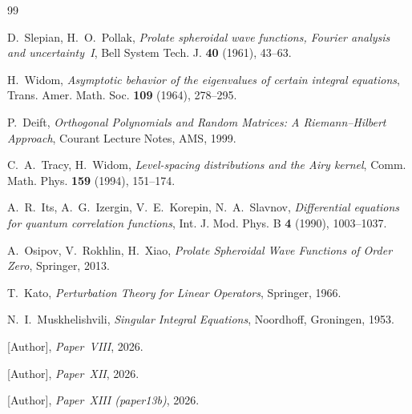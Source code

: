 \documentclass[12pt,a4paper]{amsart}
\theoremstyle{definition}
\theoremstyle{remark}
\begin{document}
\begin{thebibliography}{99}

D.~Slepian, H.~O.~Pollak,
\textit{Prolate spheroidal wave functions, Fourier analysis and
uncertainty~I},
Bell System Tech. J. \textbf{40} (1961), 43--63.

H.~Widom,
\textit{Asymptotic behavior of the eigenvalues of certain integral
equations},
Trans. Amer. Math. Soc. \textbf{109} (1964), 278--295.

P.~Deift,
\textit{Orthogonal Polynomials and Random Matrices: A Riemann--Hilbert
Approach},
Courant Lecture Notes, AMS, 1999.

C.~A.~Tracy, H.~Widom,
\textit{Level-spacing distributions and the Airy kernel},
Comm. Math. Phys. \textbf{159} (1994), 151--174.

A.~R.~Its, A.~G.~Izergin, V.~E.~Korepin, N.~A.~Slavnov,
\textit{Differential equations for quantum correlation functions},
Int. J. Mod. Phys. B \textbf{4} (1990), 1003--1037.

A.~Osipov, V.~Rokhlin, H.~Xiao,
\textit{Prolate Spheroidal Wave Functions of Order Zero},
Springer, 2013.

T.~Kato,
\textit{Perturbation Theory for Linear Operators},
Springer, 1966.

N.~I.~Muskhelishvili,
\textit{Singular Integral Equations},
Noordhoff, Groningen, 1953.

[Author], \textit{Paper~VIII}, 2026.

[Author], \textit{Paper~XII}, 2026.

[Author], \textit{Paper~XIII (paper13b)}, 2026.

\end{thebibliography}
\end{document}
